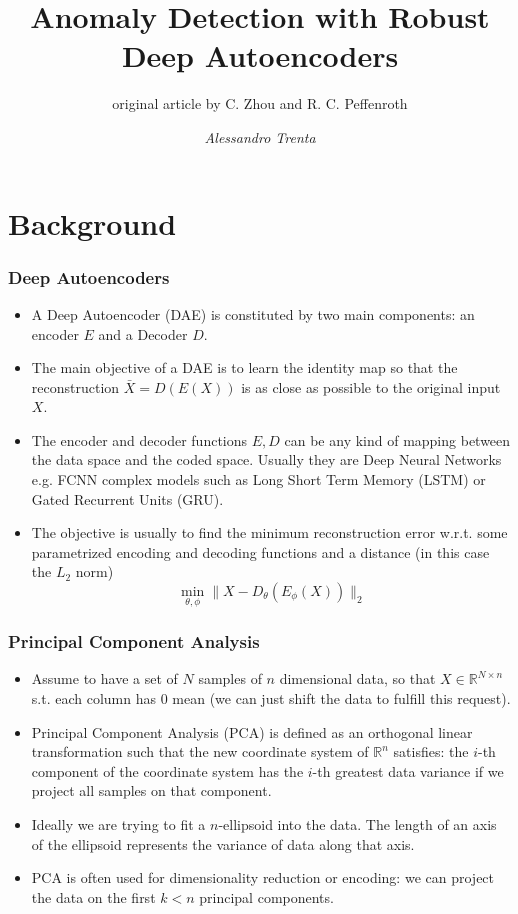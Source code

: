 \documentclass{beamer}
\title[Anomaly Detection with Robust Deep Autoencoders]{Anomaly Detection with Robust Deep Autoencoders} %
\subtitle[]{original article by C. Zhou and R. C. Peffenroth}
\author[Alessandro Trenta]{\emph{Alessandro Trenta}} %
\institute[SNS] %
{Scuola Normale Superiore \\ %
}
\date{} %
\theoremstyle{plain}
\theoremstyle{definition}
\theoremstyle{remark}
\newcommand{\R}{\mathbb{R}}
\newcommand{\norm}[1]{\lVert#1\rVert}
\begin{document}
\begin{frame}
	\titlepage %
\end{frame}

\begin{frame}
	\tableofcontents
\end{frame}

\nocite{RAE}

\section{Background}

\begin{frame}
	\frametitle{Deep Autoencoders}
	\begin{itemize}
		\item A Deep Autoencoder (DAE) is constituted by two main components: an encoder $E$ and a Decoder $D$.
		\item The main objective of a DAE is to learn the identity map so that the reconstruction $\bar{X}=D(E(X))$ is as close as possible to the original input $X$.
		\item The encoder and decoder functions $E, D$ can be any kind of mapping between the data space and the coded space. Usually they are Deep Neural Networks e.g. FCNN complex models such as Long Short Term Memory (LSTM) or Gated Recurrent Units (GRU).
		\item The objective is usually to find the minimum reconstruction error w.r.t. some parametrized encoding and decoding functions and a distance (in this case the $L_2$ norm)
			\begin{equation}
				\min_{\theta, \phi}{\norm{X-D_{\theta}(E_{\phi}(X))}_{2}}
			\end{equation}
	\end{itemize}
\end{frame}

\begin{frame}
	\frametitle{Principal Component Analysis}
	\begin{itemize}
		\item Assume to have a set of $N$ samples of $n$ dimensional data, so that $X\in \R^{N\times n}$ s.t. each column has $0$ mean (we can just shift the data to fulfill this request).
		\item Principal Component Analysis (PCA) is defined as an orthogonal linear transformation such that the new coordinate system of $\R^{n}$ satisfies: 
			the $i$-th component of the coordinate system has the $i$-th greatest data variance if we project all samples on that component.
		\item Ideally we are trying to fit a $n$-ellipsoid into the data. The length of an axis of the ellipsoid represents the variance of data along that axis.
		\item PCA is often used for dimensionality reduction or encoding: we can project the data on the first $k<n$ principal components.
	\end{itemize}
\end{frame}
\end{document}
